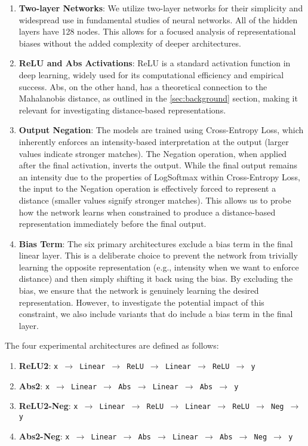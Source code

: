 \begin{enumerate}
    \item \textbf{Two-layer Networks}: We utilize two-layer networks for their simplicity and widespread use in fundamental studies of neural networks. All of the hidden layers have 128 nodes. This allows for a focused analysis of representational biases without the added complexity of deeper architectures.

    \item \textbf{ReLU and Abs Activations}: ReLU is a standard activation function in deep learning, widely used for its computational efficiency and empirical success. Abs, on the other hand, has a theoretical connection to the Mahalanobis distance, as outlined in the \ref{sec:background} section, making it relevant for investigating distance-based representations.

    \item \textbf{Output Negation}: The models are trained using Cross-Entropy Loss, which inherently enforces an intensity-based interpretation at the output (larger values indicate stronger matches). The Negation operation, when applied after the final activation, inverts the output. While the final output remains an intensity due to the properties of LogSoftmax within Cross-Entropy Loss, the input to the Negation operation is effectively forced to represent a distance (smaller values signify stronger matches). This allows us to probe how the network learns when constrained to produce a distance-based representation immediately before the final output.

    \item \textbf{Bias Term}: The six primary architectures exclude a bias term in the final linear layer. This is a deliberate choice to prevent the network from trivially learning the opposite representation (e.g., intensity when we want to enforce distance) and then simply shifting it back using the bias. By excluding the bias, we ensure that the network is genuinely learning the desired representation. However, to investigate the potential impact of this constraint, we also include variants that do include a bias term in the final layer.
\end{enumerate}

The four experimental architectures are defined as follows:

\begin{enumerate}
    \item \textbf{ReLU2}: \texttt{x $\to$ Linear $\to$ ReLU $\to$ Linear $\to$ ReLU $\to$ y}
    \item \textbf{Abs2}: \texttt{x $\to$ Linear $\to$ Abs $\to$ Linear $\to$ Abs $\to$ y}
    \item \textbf{ReLU2-Neg}: \texttt{x $\to$ Linear $\to$ ReLU $\to$ Linear $\to$ ReLU $\to$ Neg $\to$ y}
    \item \textbf{Abs2-Neg}: \texttt{x $\to$ Linear $\to$ Abs $\to$ Linear $\to$ Abs $\to$ Neg $\to$ y}
\end{enumerate}

